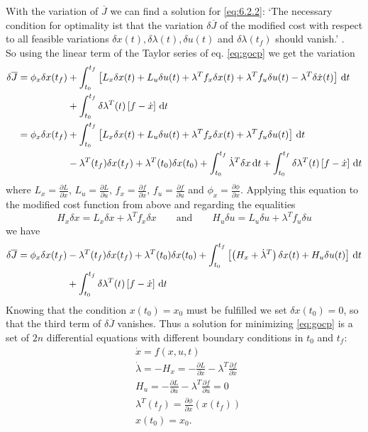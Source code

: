 \documentclass[paper=a4, pagesize, DIV=calc, BCOR=12.5mm, twoside=on, onecolumn=on, open = any, titlepage =on, parskip =half-, headsepline = on, footsepline = on, chapterprefix = on, appendixprefix = off, fontsize = 12pt, numbers = noenddot, abstract = on]{scrbook}
\numberwithin{equation}{chapter}
\theoremstyle{definition}
\theoremstyle{plain}
\theoremstyle{plain}
\theoremstyle{remark}
\theoremstyle{plain}
\theoremstyle{plain}
\begin{document}
With the variation of $\overline{J}$ we can find a solution for \eqref{eq:6.2.2}: `The necessary condition for optimality ist that the variation $\delta \overline{J}$ of the modified cost with respect to all feasible variations $\delta x(t), \delta \lambda(t), \delta u(t)$ and $\delta \lambda(t_f)$ should vanish.' \cite{li:2006}.\\
So using the linear term of the Taylor series of eq. \eqref{eq:gocp} we get the variation
\begin{align*}
\delta \overline{J} = \phi_x \delta x(t_f) & + \int_{t_0}^{t_f} \left[ L_x\delta x(t) + L_u\delta u(t) + \lambda^T f_x \delta x(t) + \lambda^T f_u \delta u(t) - \lambda^T \delta \dot{x} (t) \right] \, \mathop{}\!\mathrm{d} t\\
& + \int_{t_0}^{t_f} \delta \lambda^T (t) \left[ f - \dot{x} \right] \, \mathop{}\!\mathrm{d} t\\
= \phi_x \delta x(t_f) & + \int_{t_0}^{t_f} \left[ L_x\delta x(t) + L_u\delta u(t) + \lambda^T f_x \delta x(t) + \lambda^T f_u \delta u(t) \right]\, \mathop{}\!\mathrm{d} t\\
& - \lambda^T (t_f )\delta x(t_f) + \lambda^T(t_0)\delta x(t_0) + \int_{t_0}^{t_f} \dot{\lambda}^T\delta x \mathop{}\!\mathrm{d} t + \int_{t_0}^{t_f} \delta \lambda^T (t) \left[ f - \dot{x} \right] \, \mathop{}\!\mathrm{d} t
\end{align*}
\vspace*{0.5cm}
where $L_x = \frac{\partial L}{\partial x}$, $L_u = \frac{\partial L}{\partial u}$, $f_x = \frac{\partial f}{\partial x}$, $f_u = \frac{\partial f}{\partial u}$ and $\phi_x = \frac{\partial \phi}{\partial x}$.
Applying this equation to the modified cost function from above and regarding the equalities 
\begin{equation*}
H_x \delta x = L_x \delta x + \lambda^T f_x \delta x \qquad \text{and} \qquad
H_u \delta u = L_u \delta u + \lambda^T f_u \delta u
\end{equation*}
we have
\begin{align*}
\delta \overline{J} =   \phi_x \delta x(t_f) & - \lambda^T(t_f) \delta x(t_f) + \lambda^T(t_0)\delta x(t_0) + \int_{t_0}^{t_f} \left[ \left( H_x + \dot{\lambda}^T \right) \delta x(t) + H_u \delta u(t) \right] \, \mathop{}\!\mathrm{d} t\\
& + \int_{t_0}^{t_f} \delta \lambda^T (t) \left[ f - \dot{x} \right] \, \mathop{}\!\mathrm{d} t
\end{align*}
Knowing that the condition $x(t_0) = x_0$ must be fulfilled we set $\delta x(t_0) = 0$, so that the third term of $\delta \overline{J}$ vanishes. Thus a solution for minimizing \eqref{eq:gocp} is a set of $2n$ differential equations with different boundary conditions in $t_0$ and $t_f$:
\begin{align}
& \dot{x} = f(x, u, t)\\
& \dot{\lambda} = -H_x = - \frac{\partial L}{\partial x} - \lambda^T \frac{\partial f}{\partial x}\\
& H_u = - \frac{\partial L}{\partial u} - \lambda^T \frac{\partial f}{\partial u} = 0\\
& \lambda^T(t_f) = \frac{\partial \phi}{\partial x} (x(t_f))\\
& x(t_0) = x_0.
\end{align}
\end{document}
